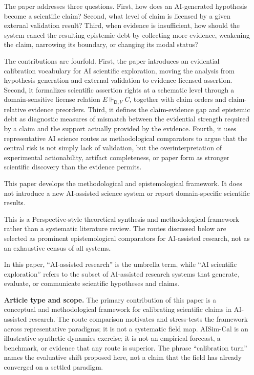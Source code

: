 \documentclass[11pt,a4paper]{article}
\newcommand{\Dom}{\mathsf{D}}
\begin{document}
The paper addresses three questions. First, how does an AI-generated hypothesis become a scientific claim? Second, what level of claim is licensed by a given external validation result? Third, when evidence is insufficient, how should the system cancel the resulting epistemic debt by collecting more evidence, weakening the claim, narrowing its boundary, or changing its modal status?

The contributions are fourfold. First, the paper introduces an evidential calibration vocabulary for AI scientific exploration, moving the analysis from hypothesis generation and external validation to evidence-licensed assertion. Second, it formalizes scientific assertion rights at a schematic level through a domain-sensitive license relation $E\Vdash_{\Dom,V} C$, together with claim orders and claim-relative evidence preorders. Third, it defines the claim-evidence gap and epistemic debt as diagnostic measures of mismatch between the evidential strength required by a claim and the support actually provided by the evidence. Fourth, it uses representative AI science routes as methodological comparators to argue that the central risk is not simply lack of validation, but the overinterpretation of experimental actionability, artifact completeness, or paper form as stronger scientific discovery than the evidence permits.

This paper develops the methodological and epistemological framework. It does not introduce a new AI-assisted science system or report domain-specific scientific results.

This is a Perspective-style theoretical synthesis and methodological framework rather than a systematic literature review. The routes discussed below are selected as prominent epistemological comparators for AI-assisted research, not as an exhaustive census of all systems.

In this paper, ``AI-assisted research'' is the umbrella term, while ``AI scientific exploration'' refers to the subset of AI-assisted research systems that generate, evaluate, or communicate scientific hypotheses and claims.

\textbf{Article type and scope.} The primary contribution of this paper is a conceptual and methodological framework for calibrating scientific claims in AI-assisted research. The route comparison motivates and stress-tests the framework across representative paradigms; it is not a systematic field map. AISim-Cal is an illustrative synthetic dynamics exercise; it is not an empirical forecast, a benchmark, or evidence that any route is superior. The phrase ``calibration turn'' names the evaluative shift proposed here, not a claim that the field has already converged on a settled paradigm.
\end{document}
